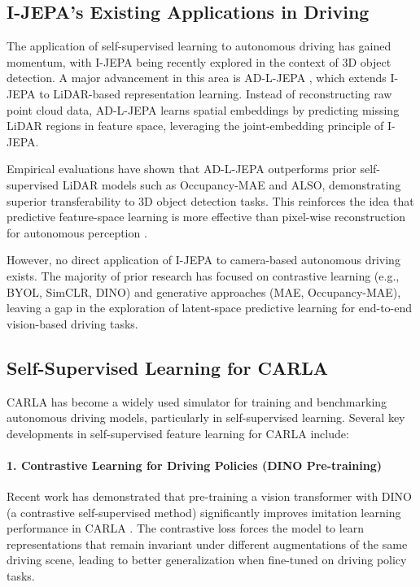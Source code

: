 \documentclass{article}
\begin{document}
\subsection{I-JEPA’s Existing Applications in Driving}

The application of self-supervised learning to autonomous driving has gained momentum, with I-JEPA being recently explored in the context of 3D object detection. A major advancement in this area is AD-L-JEPA \citep{zhu2025adljepa}, which extends I-JEPA to LiDAR-based representation learning. Instead of reconstructing raw point cloud data, AD-L-JEPA learns spatial embeddings by predicting missing LiDAR regions in feature space, leveraging the joint-embedding principle of I-JEPA.

Empirical evaluations have shown that AD-L-JEPA outperforms prior self-supervised LiDAR models such as Occupancy-MAE and ALSO, demonstrating superior transferability to 3D object detection tasks. This reinforces the idea that predictive feature-space learning is more effective than pixel-wise reconstruction for autonomous perception \citep{zhu2025adljepa}.

However, no direct application of I-JEPA to camera-based autonomous driving exists. The majority of prior research has focused on contrastive learning (e.g., BYOL, SimCLR, DINO) and generative approaches (MAE, Occupancy-MAE), leaving a gap in the exploration of latent-space predictive learning for end-to-end vision-based driving tasks.

\subsection{Self-Supervised Learning for CARLA}
CARLA has become a widely used simulator for training and benchmarking autonomous driving models, particularly in self-supervised learning. Several key developments in self-supervised feature learning for CARLA include:

\paragraph{1. Contrastive Learning for Driving Policies (DINO Pre-training)}
Recent work has demonstrated that pre-training a vision transformer with DINO (a contrastive self-supervised method) significantly improves imitation learning performance in CARLA \citep{carla_dino2024}. The contrastive loss forces the model to learn representations that remain invariant under different augmentations of the same driving scene, leading to better generalization when fine-tuned on driving policy tasks.
\end{document}
